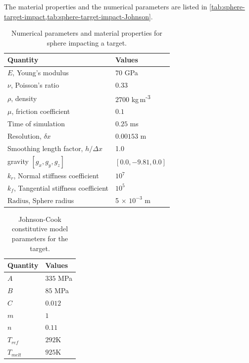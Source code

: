 The material properties and the numerical parameters are listed in
\cref{tab:sphere-target-impact,tab:sphere-target-impact-Johnson}.
\begin{table}[!ht]
  \caption{Numerical parameters and material properties for sphere impacting a target.}%
  \label{tab:mpe-2-mat-prop}
  \centering
  \begin{tabular}[!ht]{ll}
    \toprule
    Quantity & Values\\
    \midrule
    $E$, Young's modulus & $70$ GPa \\
    $\nu$, Poisson's ratio & $0.33$ \\
    $\rho$, density & $2700$ kg\,m\textsuperscript{-3} \\
    $\mu$, friction coefficient & $0.1$ \\
    Time of simulation & $0.25$ ms \\
    Resolution, $\delta x$ & $0.00153$ m\\
    Smoothing length factor, $h/\Delta x$ & 1.0\\
    gravity $[g_x, g_y, g_z]$ & $[0.0, -9.81, 0.0]$\\
    $k_r$, Normal stiffness coefficient & $10^{7}$ \\
    $k_f$, Tangential stiffness coefficient & $10^{5}$ \\
    $\text{Radius}$, Sphere radius & 5 $\times$ $10^{-3}$ m\\
    \bottomrule
  \end{tabular}
\end{table}
\begin{table}[!ht]
  \caption{Johnson-Cook constitutive model parameters for the target.}%
  \label{tab:mpe-2-john-prop}
  \centering
  \begin{tabular}[!ht]{ll}
    \toprule
    Quantity & Values\\
    \midrule
    $A$ & $335$ MPa \\
    $B$ & $85$ MPa \\
    $C$ & $0.012$ \\
    $m$ & $1$ \\
    $n$ & $0.11$ \\
    $T_{ref}$ & $292$K \\
    $T_{melt}$ & $925$K \\
    \bottomrule
  \end{tabular}
\end{table}




